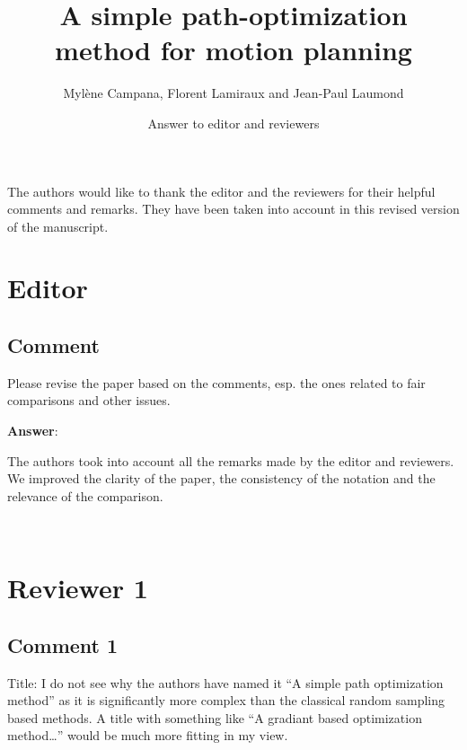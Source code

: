\documentclass{scrartcl}
\begin{document}
\title{A simple path-optimization method for motion planning}
\author{Myl\`{e}ne Campana, Florent Lamiraux and Jean-Paul Laumond}
\date{Answer to editor and reviewers}
\maketitle

The authors would like to thank the editor and the reviewers for their helpful comments and remarks.
They have been taken into account in this revised version of the manuscript.

\section{Editor}

\subsection{Comment}

Please revise the paper based on the comments, esp. the ones related to fair comparisons and other issues.

\vspace{0.5cm}

\textbf{Answer}:

The authors took into account all the remarks made by the editor and reviewers.
We improved the clarity of the paper, the consistency of the notation and the relevance of the comparison.

\noindent
\hrulefill\\

\section{Reviewer 1}

\subsection{Comment 1}

Title:
I do not see why the authors have named it “A simple path optimization method” as it is significantly more complex than the classical random sampling based methods. A title with something like “A gradiant based optimization method…” would be much more fitting in my view.
\end{document}
